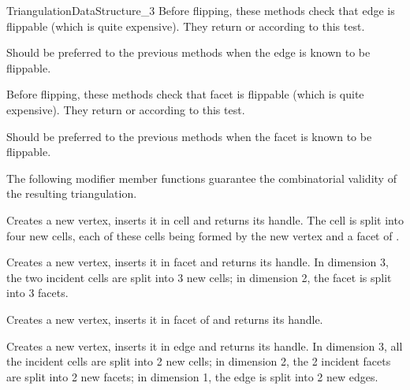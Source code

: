 \begin{ccRefConcept}{TriangulationDataStructure_3}
\ccGlue
{}
{Before flipping, these methods check that edge  is
flippable (which is quite expensive). They return  or
 according to this test.}

\ccGlue
{}
{Should be preferred to the previous methods when the edge is
known to be flippable.
}

\ccGlue
{}
{Before flipping, these methods check that facet  is
flippable (which is quite expensive). They return  or
 according to this test.} 

\ccGlue
{}
{Should be preferred to the previous methods when the facet is
known to be flippable.
}


The following modifier member functions guarantee
the combinatorial validity of the resulting triangulation.

{Creates a new vertex, inserts it in cell  and returns its handle.
The cell  is split into four new cells, each of these cells being
formed by the new vertex and a facet of .
}

{Creates a new vertex, inserts it in facet  and returns its handle.
In dimension 3, the two incident cells are split into 3 new cells;
in dimension 2, the facet is split into 3 facets.
} 

{Creates a new vertex, inserts it in facet  of  and returns its
handle.
} 

{Creates a new vertex, inserts it in edge  and returns its handle.
In dimension 3, all the
incident cells are split into 2 new cells; in dimension 2, the 2
incident facets are split into 2 new facets; in dimension 1, the edge is 
split into 2 new edges.
} 


\end{ccRefConcept}
